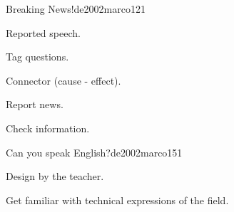 \begin{syllabus}
\begin{unit}{Breaking News!}{}{de2002marco}{12}{1}
   \begin{topics}
      \item Reported speech.
      \item Tag questions.
      \item Connector (cause - effect).
   \end{topics}

   \begin{learningoutcomes}
      \item Report news.
      \item Check information.
   \end{learningoutcomes}

\end{unit}

\begin{unit}{Can you speak English?}{}{de2002marco}{15}{1}
   \begin{topics}
      \item Design by the teacher.
   \end{topics}

   \begin{learningoutcomes}
      \item Get familiar with technical expressions of the field.
   \end{learningoutcomes}
\end{unit}

\begin{coursebibliography}
\end{coursebibliography}
\end{syllabus}
